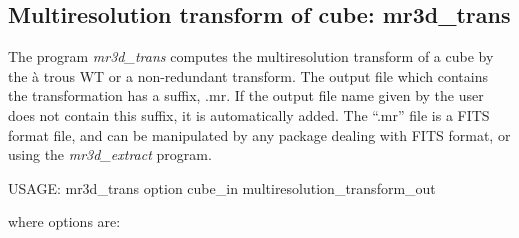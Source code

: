 \subsection{Multiresolution transform of cube: mr3d\_trans}
\label{sect_trans3d}
The program 
{\em mr3d\_trans} computes the multiresolution transform of a cube by
the \`a trous WT or a non-redundant transform. 
The output file which contains the transformation has a 
suffix, .mr. If the output file name
given by the user does not contain this suffix, it is automatically
added. The ``.mr'' file is a FITS format file, and can be manipulated by
any package dealing with FITS format, or using the 
{\em mr3d\_extract} program.
{\bf 
\begin{center}
 USAGE: mr3d\_trans option cube\_in multiresolution\_transform\_out
\end{center}}
where options are: 
